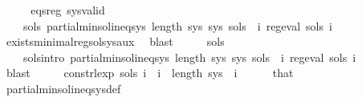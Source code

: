 \begin{isabellebody}
%
\isadelimproof
%
\endisadelimproof
%
\isatagproof
{}\isamarkupfalse%
\ {\isacharminus}{\kern0pt}\isanewline
\ \ \isamarkupfalse%
\ eqs{\isacharunderscore}{\kern0pt}reg\ sys{\isacharunderscore}{\kern0pt}valid\ \isamarkupfalse%
\isanewline
\ \ \ \ {\isachardoublequoteopen}{\isasymexists}sols{\isachardot}{\kern0pt}\ partial{\isacharunderscore}{\kern0pt}min{\isacharunderscore}{\kern0pt}sol{\isacharunderscore}{\kern0pt}ineq{\isacharunderscore}{\kern0pt}sys\ {\isacharparenleft}{\kern0pt}length\ sys{\isacharparenright}{\kern0pt}\ sys\ sols\ {\isasymand}\ {\isacharparenleft}{\kern0pt}{\isasymforall}i{\isachardot}{\kern0pt}\ reg{\isacharunderscore}{\kern0pt}eval\ {\isacharparenleft}{\kern0pt}sols\ i{\isacharparenright}{\kern0pt}{\isacharparenright}{\kern0pt}{\isachardoublequoteclose}\isanewline
\ \ \ \ \isamarkupfalse%
\ exists{\isacharunderscore}{\kern0pt}minimal{\isacharunderscore}{\kern0pt}reg{\isacharunderscore}{\kern0pt}sol{\isacharunderscore}{\kern0pt}sys{\isacharunderscore}{\kern0pt}aux\ \isamarkupfalse%
\ blast\isanewline
\ \ \isamarkupfalse%
\ \isamarkupfalse%
\ sols\ \isanewline
\ \ \ \ sols{\isacharunderscore}{\kern0pt}intro{\isacharcolon}{\kern0pt}\ {\isachardoublequoteopen}partial{\isacharunderscore}{\kern0pt}min{\isacharunderscore}{\kern0pt}sol{\isacharunderscore}{\kern0pt}ineq{\isacharunderscore}{\kern0pt}sys\ {\isacharparenleft}{\kern0pt}length\ sys{\isacharparenright}{\kern0pt}\ sys\ sols\ {\isasymand}\ {\isacharparenleft}{\kern0pt}{\isasymforall}i{\isachardot}{\kern0pt}\ reg{\isacharunderscore}{\kern0pt}eval\ {\isacharparenleft}{\kern0pt}sols\ i{\isacharparenright}{\kern0pt}{\isacharparenright}{\kern0pt}{\isachardoublequoteclose}\isanewline
\ \ \ \ \isamarkupfalse%
\ blast\isanewline
\ \ \isamarkupfalse%
\ \isamarkupfalse%
\ {\isachardoublequoteopen}const{\isacharunderscore}{\kern0pt}rlexp\ {\isacharparenleft}{\kern0pt}sols\ i{\isacharparenright}{\kern0pt}{\isachardoublequoteclose}\ \ {\isachardoublequoteopen}i\ {\isacharless}{\kern0pt}\ length\ sys{\isachardoublequoteclose}\ \ i\isanewline
\ \ \ \ \isamarkupfalse%
\ that\ \isamarkupfalse%
\ partial{\isacharunderscore}{\kern0pt}min{\isacharunderscore}{\kern0pt}sol{\isacharunderscore}{\kern0pt}ineq{\isacharunderscore}{\kern0pt}sys{\isacharunderscore}{\kern0pt}def\ \isamarkupfalse%

\end{isabellebody}
